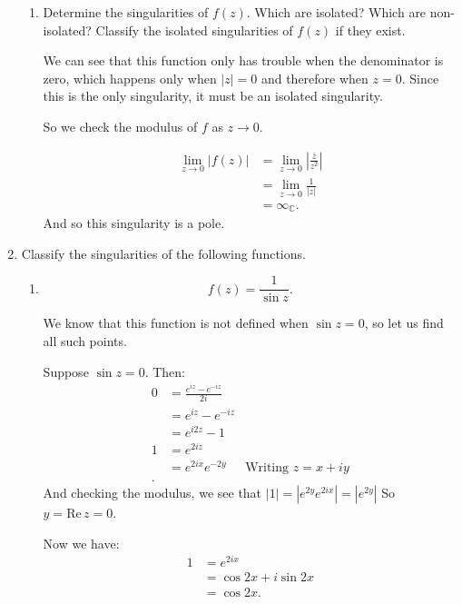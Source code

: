 \documentclass{article}
\begin{document}
\begin{enumerate}
\begin{enumerate}[label= (\alph*)]
    \item Determine the singularities of $f (z)$. Which are isolated? Which
        are non-isolated? Classify the isolated singularities of $f (z)$ if
        they exist.

        We can see that this function only has trouble when the denominator is zero, which happens
        only when $|z|=0$ and therefore when $z=0$. Since this is the only singularity,
        it must be an isolated singularity.

        So we check the modulus of $f$ as $z\to 0$. 

        \begin{align*}
            \lim_{z \to 0} |f(z)|&= \lim_{z \to 0} \left| \frac{\bar{z}}{z^2} \right|  \\
            &= \lim_{z \to 0} \frac{1}{|z|} \\
            &= \infty_{\mathbb{C}} 
        .\end{align*}
        And so this singularity is a pole.

\end{enumerate}
\item Classify the singularities of the following functions.
    \begin{enumerate}[label= (\alph*)] 
        \item \[ f(z)=\frac{1}{\sin z} .\]
            
            We know that this function is not defined when $\sin z=0$, so let us find all such points.

            Suppose $\sin z =0$. Then:
            \begin{align*}
                0&=\frac{e^{iz}-e^{-iz}}{2i}\\
                &= e^{iz}-e^{-iz} \\
                &= e^{i 2z}-1 \\
                1&= e^{2iz} \\
                 &= e^{2ix}e^{-2y}&\text{Writing }z=x+iy\\
            .\end{align*}
            And checking the modulus, we see that $|1|=|e^{2y}e^{2ix}|=|e^{2y}|$ So 
            $y=\mathrm{Re}\,z=0$.

            Now we have:
            \begin{align*}
                1&= e^{2ix} \\
                &= \cos 2x+ i\sin 2x \\
                &= \cos 2x 
            .\end{align*}


\end{enumerate}
\end{enumerate}
\end{document}
